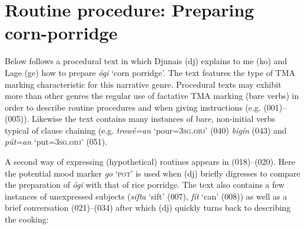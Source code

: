 \section{Routine procedure: Preparing corn-porridge}

Below follows a procedural text in which Djunais (dj) explains to me (ko) and Lage (ge) how to prepare \textit{ógi} ‘corn porridge’. The text features the type of TMA marking characteristic for this narrative genre. Procedural texts may exhibit more than other genres the regular use of factative TMA marking (bare verbs) in order to describe routine procedures and when giving instructions (e.g. (001)–(005)). Likewise the text contains many instances of bare, non-initial verbs typical of clause chaining (e.g. \textit{trowé=an} ‘pour=\textsc{3sg.obj}’ (040) \textit{bigín} (043) and \textit{pút=an} ‘put={}\textsc{3sg.obj}’ (051).


A second way of expressing (hypothetical) routines appears in (018)–(020). Here the potential mood marker \textit{go} ‘\textsc{pot}’ is used when (dj) briefly digresses to compare the preparation of \textit{ógi} with that of rice porridge. The text also contains a few instances of unexpressed subjects (\textit{sifta} ‘sift’ (007), \textit{fít} ‘can’ (008)) as well as a brief conversation (021)–(034) after which (dj) quickly turns back to describing the cooking:

\setcounter{equation}{0}  %

